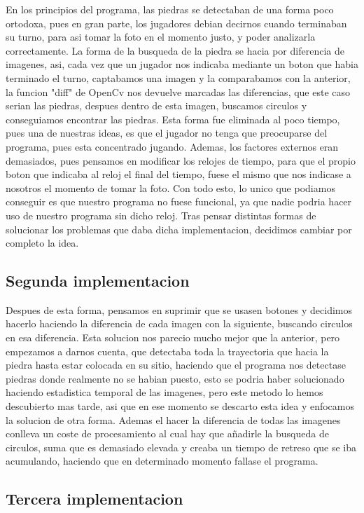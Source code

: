 \documentclass[12pt,a4paper]{report}
\begin{document}
En los principios del programa, las piedras se detectaban de una forma poco ortodoxa, pues en gran parte, los jugadores debian decirnos cuando terminaban su turno, para asi tomar la foto en el momento justo, y poder analizarla correctamente.
La forma de la busqueda de la piedra se hacia por diferencia de imagenes, asi, cada vez que un jugador nos indicaba mediante un boton que habia terminado el turno, captabamos una imagen y la comparabamos con la anterior, la funcion "diff" de OpenCv nos devuelve marcadas las diferencias, que este caso serian las piedras, despues dentro de esta imagen, buscamos circulos y conseguiamos encontrar las piedras. 
Esta forma fue eliminada al poco tiempo, pues una de nuestras ideas, es que el jugador no tenga que preocuparse del programa, pues esta concentrado jugando. Ademas, los factores externos eran demasiados, pues pensamos en modificar los relojes de tiempo, para que el propio boton que indicaba al reloj el final del tiempo, fuese el mismo que nos indicase a nosotros el momento de tomar la foto. Con todo esto, lo unico que podiamos conseguir es que nuestro programa no fuese funcional, ya que nadie podria hacer uso de nuestro programa sin dicho reloj. Tras pensar distintas formas de solucionar los problemas que daba dicha implementacion, decidimos cambiar por completo la idea.

\subsection{Segunda implementacion} %

Despues de esta forma, pensamos en suprimir que se usasen botones y decidimos hacerlo haciendo la diferencia de cada imagen con la siguiente, buscando circulos en esa diferencia. Esta solucion nos parecio mucho mejor que la anterior, pero empezamos a darnos cuenta, que detectaba toda la trayectoria que hacia la piedra hasta estar colocada en su sitio, haciendo que el programa nos detectase piedras donde realmente no se habian puesto, esto se podria haber solucionado haciendo estadistica temporal de las imagenes, pero este metodo lo hemos descubierto mas tarde, asi que en ese momento se descarto esta idea y enfocamos la solucion de otra forma. Ademas el hacer la diferencia de todas las imagenes conlleva un coste de procesamiento al cual hay que añadirle la busqueda de circulos, suma que es demasiado elevada y creaba un tiempo de retreso que se iba acumulando, haciendo que en determinado momento fallase el programa.

\subsection{Tercera implementacion}%
\end{document}
